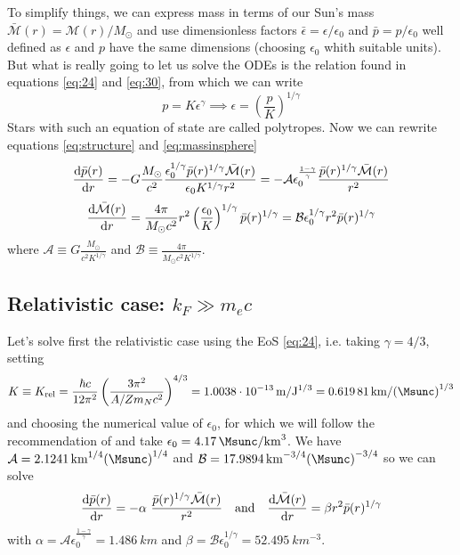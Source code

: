 \documentclass[a4paper]{article}
\newcommand\M{\mathcal{M}}
\newcommand\Mbar{\bar{\mathcal{M}}}
\newcommand\Msun{M_{\odot}}
\begin{document}
To simplify things, we can express mass in terms of our Sun's mass  $\Mbar(r) = {\M}(r)/\Msun $ and use dimensionless factors $\bar{\epsilon} = \epsilon/\epsilon_{0}$ and $\bar{p} = p/\epsilon_{0}$ well defined as $\epsilon$ and $p$ have the same dimensions (choosing $\epsilon_0$ whith suitable units). But what is really going to let us solve the ODEs is the relation found in equations \eqref{eq:24} and \eqref{eq:30}, from which we can write
\begin{equation}
    p = K\epsilon^{\gamma} \implies \epsilon = \left(\frac{p}{K}\right)^{1/\gamma}
\end{equation}
Stars with such an equation of state are called polytropes. Now we can rewrite equations \eqref{eq:structure} and \eqref{eq:massinsphere} 
\begin{equation}
    \odv{\bar{p}(r)}{r} = -G\frac{\Msun }{c^2}\frac{\epsilon_0^{1/\gamma}\bar{p}(r)^{1/\gamma}\Mbar(r)}{\epsilon_0 K^{1/\gamma}r^2} = -\mathcal{A}\epsilon_0^{\frac{1-\gamma}{\gamma}}\frac{\bar{p}(r)^{1/\gamma}\Mbar(r)}{r^2}
\end{equation}
\begin{equation}
    \odv{\Mbar(r)}{r} = \frac{4\pi}{\Msun c^2} r^2\left(\frac{\epsilon_0}{K}\right)^{1/\gamma}\bar{p}(r)^{1/\gamma} = \mathcal{B}\epsilon_0^{1/\gamma}r^2\bar{p}(r)^{1/\gamma}
\end{equation}
where $\mathcal{A} \equiv G\frac{\Msun }{c^2K^{1/\gamma}} $ and $\mathcal{B} \equiv \frac{4\pi}{\Msun c^2 K^{1/\gamma}}$. 

\subsection[Relativistic case]{Relativistic case: $k_F \gg  m_e c$} \label{subsec:solvingrel}

Let's solve first the relativistic case using the EoS \eqref{eq:24}, i.e. taking $\gamma = 4/3$, setting
\[K \equiv K_{\mathrm{rel}} =
\frac{\hbar c}{12 \pi ^2}\left(\frac{3\pi^2}{A/Zm_Nc^2}\right)^{4/3} 
=\qty{1.0038e-13}{m/J^{1/3}}
=\qty{0.61981}{km/(\Msunc)^{1/3}}\]
and choosing the numerical value of $\epsilon_0$, for which we will follow the recommendation of  \cite{silbarNeutronStarsUndergraduates2004} and take $\epsilon_0 = \qty{4.17}{\Msunc/km^3}$. We have $\mathcal{A} = \qty{2.1241}{km^{1/4} (\Msunc)^{1/4}}$ and $\mathcal{B} = \qty{17.9894}{km^{-3/4}(\Msunc)^{-3/4}}$ so we can solve
\begin{equation} \label{eq:37}
    \odv{\bar{p}(r)}{r} = -\alpha~ \frac{\bar{p}(r)^{1/\gamma}\Mbar(r)}{r^2} 
    \quad \mathrm{and} \quad
    \odv{\Mbar(r)}{r} = \beta r^2\bar{p}(r)^{1/\gamma}
\end{equation}
with $\alpha = \mathcal{A}\epsilon_0^{\frac{1-\gamma}{\gamma}} = \qty{1.486}{km}$ and $\beta = \mathcal{B}\epsilon_0^{1/\gamma} = \qty{52.495}{km^{-3}}$.
\end{document}
